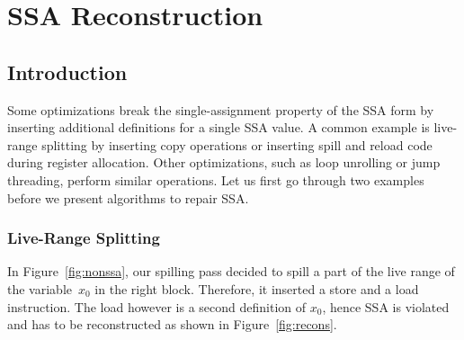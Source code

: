 \chapter{SSA Reconstruction }

\section{Introduction}

Some optimizations break the single-assignment property of the SSA form by inserting additional definitions for a single SSA value.
A common example is live-range splitting by inserting copy operations or inserting spill and reload code during register allocation.
Other optimizations, such as loop unrolling or jump threading, perform similar operations.
Let us first go through two examples before we present algorithms to repair SSA.

\subsection{Live-Range Splitting}

In Figure~\ref{fig:nonssa}, our spilling pass decided to spill a part of the live range of the variable~$x_0$ in the right block.
Therefore, it inserted a store and a load instruction. 
The load however is a second definition of $x_0$, hence SSA is violated and has to be reconstructed as shown in Figure~\ref{fig:recons}.

